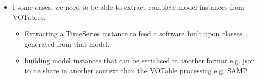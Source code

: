 \begin{itemize}
  \item I some cases, we need to be able to extract complete model instances from VOTables.
    \begin{itemize}
      \item Extracting a TimeSeries instance to feed a software built upon classes generated from that model.
      \item building model instances that can be serialised in another format e.g. json to ne share in another context than the VOTable processing e.g. SAMP
   \end{itemize}          
    
\end{itemize} 

